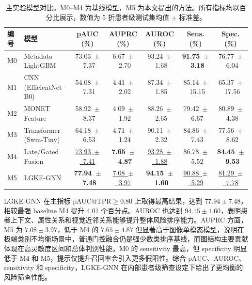 \documentclass[UTF8,a4paper,10pt,twocolumn,fontset=fandol]{ctexart}
\renewcommand{\arraystretch}{1.12}
\newcommand{\modelname}{LGKE-GNN}
\begin{document}
\begin{table}[t]
\centering
\small
\renewcommand{\arraystretch}{1.22}
\setlength{\tabcolsep}{3pt}
\caption{主实验模型对比。M0--M4 为基线模型，M5 为本文提出的方法。所有指标均以百分比展示，数值为 5 折患者级测试集均值 $\pm$ 标准差。}
\label{tab:main_results}

\begin{tabular*}{\textwidth}{@{\extracolsep{\fill}}llccccc}
\toprule
编号 & 模型 & pAUC (\%) & AUPRC (\%) & AUROC (\%) & Sens. (\%) & Spec. (\%) \\
\midrule
M0 & Metadata LightGBM
& \mbox{73.03 $\pm$ 7.37}
& \mbox{6.67 $\pm$ 2.70}
& \mbox{93.24 $\pm$ 1.68}
& \mbox{\textbf{91.75 $\pm$ 3.18}}
& \mbox{76.77 $\pm$ 6.04} \\

M1 & CNN (EfficientNet-B0)
& \mbox{54.08 $\pm$ 7.31}
& \mbox{4.41 $\pm$ 2.02}
& \mbox{87.34 $\pm$ 1.85}
& \mbox{85.14 $\pm$ 15.15}
& \mbox{65.37 $\pm$ 17.56} \\

M2 & MONET Feature
& \mbox{58.92 $\pm$ 8.37}
& \mbox{4.09 $\pm$ 1.92}
& \mbox{88.26 $\pm$ 2.65}
& \mbox{79.42 $\pm$ 6.67}
& \mbox{80.89 $\pm$ 4.38} \\

M3 & Transformer (Swin-Tiny)
& \mbox{64.18 $\pm$ 6.53}
& \mbox{4.71 $\pm$ 1.24}
& \mbox{90.11 $\pm$ 2.32}
& \mbox{84.86 $\pm$ 7.43}
& \mbox{77.56 $\pm$ 8.62} \\

M4 & Late/Gated Fusion
& \mbox{\underline{73.93 $\pm$ 7.41}}
& \mbox{\textbf{7.65 $\pm$ 4.87}}
& \mbox{\underline{93.28 $\pm$ 1.88}}
& \mbox{86.78 $\pm$ 5.52}
& \mbox{\textbf{84.45 $\pm$ 9.53}} \\

M5 & \modelname{}
& \mbox{\textbf{77.94 $\pm$ 7.48}}
& \mbox{\underline{7.08 $\pm$ 3.97}}
& \mbox{\textbf{94.15 $\pm$ 1.60}}
& \mbox{\underline{90.88 $\pm$ 5.29}}
& \mbox{\underline{81.29 $\pm$ 7.78}} \\
\bottomrule
\end{tabular*}
\end{table}

\modelname{} 在主指标 pAUC@TPR$\geq0.80$ 上取得最高结果，达到 $77.94\pm7.48$，相较最强 baseline M4 提升 4.01 个百分点。AUROC 也达到 $94.15\pm1.60$，表明患者上下文、属性关系和视觉近邻关系能够提升整体风险排序能力。AUPRC 方面，M5 为 $7.08\pm3.97$，低于 M4 的 $7.65\pm4.87$ 但显著高于图像单模态模型，说明在极端类别不均衡场景中，普通门控融合仍是强少数类排序基线，而图结构主要贡献体现在高灵敏度区间和总体判别性能。M0 的 sensitivity 最高，但 specificity 明显低于 M4 和 M5，提示仅提升召回率会引入更多假阳性。综合 pAUC、AUROC、sensitivity 和 specificity，\modelname{} 在内部患者级筛查设定下给出了更均衡的风险筛查性能。
\end{document}
